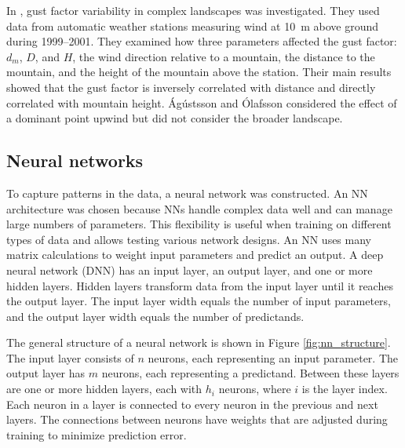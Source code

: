 In \cite{mean_gust_HA_HO}, gust factor variability in complex landscapes was investigated. They used data from automatic weather stations measuring wind at 10~m above ground during 1999–2001. They examined how three parameters affected the gust factor: $d_m$, $D$, and $H$, the wind direction relative to a mountain, the distance to the mountain, and the height of the mountain above the station. Their main results showed that the gust factor is inversely correlated with distance and directly correlated with mountain height. Ágústsson and Ólafsson considered the effect of a dominant point upwind but did not consider the broader landscape.

\subsection{Neural networks}
To capture patterns in the data, a neural network was constructed. An NN architecture was chosen because NNs handle complex data well and can manage large numbers of parameters. This flexibility is useful when training on different types of data and allows testing various network designs. An NN uses many matrix calculations to weight input parameters and predict an output. A deep neural network (DNN) has an input layer, an output layer, and one or more hidden layers. Hidden layers transform data from the input layer until it reaches the output layer. The input layer width equals the number of input parameters, and the output layer width equals the number of predictands.

The general structure of a neural network is shown in Figure \ref{fig:nn_structure}. The input layer consists of $n$ neurons, each representing an input parameter. The output layer has $m$ neurons, each representing a predictand. Between these layers are one or more hidden layers, each with $h_i$ neurons, where $i$ is the layer index. Each neuron in a layer is connected to every neuron in the previous and next layers. The connections between neurons have weights that are adjusted during training to minimize prediction error.

